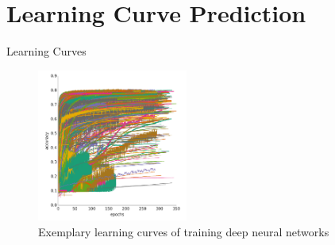 \section{Learning Curve Prediction}
\begin{frame}{Learning Curves}

\begin{figure}
   \centering
   \includegraphics[width=0.44\textwidth]{w07_hpo_grey_box/images/learningcurve/learning_curve_domhan.png}
   \caption{Exemplary learning curves of training deep neural networks}
\end{figure}




\end{frame}


